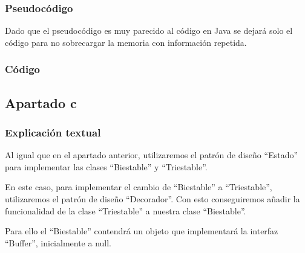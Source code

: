 \documentclass[11pt,a4paper]{article}
\begin{document}
\subsubsection{Pseudocódigo}

Dado que el pseudocódigo es muy parecido al código en Java se dejará solo el código para no sobrecargar la memoria con información repetida.


\subsubsection{Código}















\subsection{Apartado c}

\subsubsection{Explicación textual}
Al igual que en el apartado anterior, utilizaremos el patrón de diseño ``Estado'' para implementar las clases ``Biestable'' y ``Triestable''.

En este caso, para implementar el cambio de ``Biestable'' a ``Triestable'', utilizaremos el patrón de diseño ``Decorador''. Con esto conseguiremos añadir la funcionalidad de la clase ``Triestable'' a nuestra clase ``Biestable''.

Para ello el ``Biestable'' contendrá un objeto que implementará la interfaz ``Buffer'', inicialmente a null. 
\end{document}
